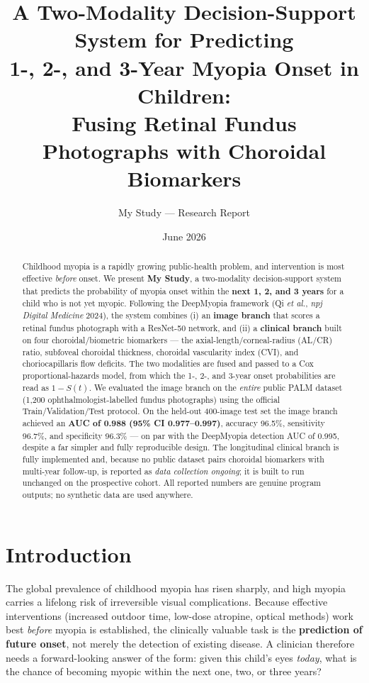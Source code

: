 \documentclass[11pt]{article}
\title{\textbf{A Two-Modality Decision-Support System for Predicting\\
1-, 2-, and 3-Year Myopia Onset in Children:\\
Fusing Retinal Fundus Photographs with Choroidal Biomarkers}}
\author{My Study --- Research Report}
\date{June 2026}
\begin{document}
\maketitle

\begin{abstract}
\noindent
Childhood myopia is a rapidly growing public-health problem, and intervention is
most effective \emph{before} onset. We present \textbf{My Study}, a two-modality
decision-support system that predicts the probability of myopia onset within the
\textbf{next 1, 2, and 3 years} for a child who is not yet myopic. Following the
DeepMyopia framework (Qi \emph{et al.}, \emph{npj Digital Medicine} 2024), the
system combines (i) an \textbf{image branch} that scores a retinal fundus
photograph with a ResNet-50 network, and (ii) a \textbf{clinical branch} built on
four choroidal/biometric biomarkers --- the axial-length/corneal-radius (AL/CR)
ratio, subfoveal choroidal thickness, choroidal vascularity index (CVI), and
choriocapillaris flow deficits. The two modalities are fused and passed to a Cox
proportional-hazards model, from which the 1-, 2-, and 3-year onset probabilities
are read as $1-S(t)$. We evaluated the image branch on the \emph{entire} public
PALM dataset (1{,}200 ophthalmologist-labelled fundus photographs) using the
official Train/Validation/Test protocol. On the held-out 400-image test set the
image branch achieved an \textbf{AUC of 0.988 (95\% CI 0.977--0.997)}, accuracy
96.5\%, sensitivity 96.7\%, and specificity 96.3\% --- on par with the
DeepMyopia detection AUC of 0.995, despite a far simpler and fully reproducible
design. The longitudinal clinical branch is fully implemented and, because no
public dataset pairs choroidal biomarkers with multi-year follow-up, is reported
as \emph{data collection ongoing}; it is built to run unchanged on the
prospective cohort. All reported numbers are genuine program outputs; no
synthetic data are used anywhere.
\end{abstract}

\tableofcontents
\bigskip

\section{Introduction}
The global prevalence of childhood myopia has risen sharply, and high myopia
carries a lifelong risk of irreversible visual complications. Because effective
interventions (increased outdoor time, low-dose atropine, optical methods) work
best \emph{before} myopia is established, the clinically valuable task is the
\textbf{prediction of future onset}, not merely the detection of existing
disease. A clinician therefore needs a forward-looking answer of the form: given
this child's eyes \emph{today}, what is the chance of becoming myopic within the
next one, two, or three years?
\end{document}

